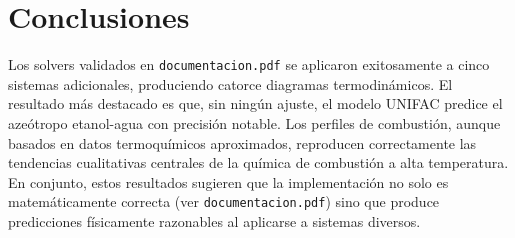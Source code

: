 \documentclass[11pt,a4paper]{article}
\begin{document}
\section{Conclusiones}

Los solvers validados en \texttt{documentacion.pdf} se aplicaron
exitosamente a cinco sistemas adicionales, produciendo catorce
diagramas termodinámicos. El resultado más destacado es que, sin
ningún ajuste, el modelo UNIFAC predice el azeótropo etanol-agua con
precisión notable. Los perfiles de combustión, aunque basados en datos
termoquímicos aproximados, reproducen correctamente las tendencias
cualitativas centrales de la química de combustión a alta temperatura.
En conjunto, estos resultados sugieren que la implementación no solo es
matemáticamente correcta (ver \texttt{documentacion.pdf}) sino que
produce predicciones físicamente razonables al aplicarse a sistemas
diversos.



\end{document}

